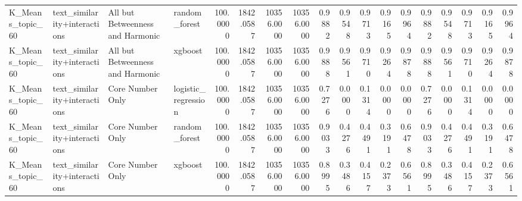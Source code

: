 \begin{tabular}{llllrrrrrrrrrrrrrr}
K_Means_topic_60 & text_similarity+interactions & All but Betweenness and Harmonic & random_forest & 100.0000 & 1842.0587 & 10356.0000 & 10356.0000 & 0.9882 & 0.9548 & 0.9713 & 0.9165 & 0.9964 & 0.9882 & 0.9548 & 0.9713 & 0.9165 & 0.9964 \\
K_Means_topic_60 & text_similarity+interactions & All but Betweenness and Harmonic & xgboost & 100.0000 & 1842.0587 & 10356.0000 & 10356.0000 & 0.9888 & 0.9561 & 0.9710 & 0.9264 & 0.9878 & 0.9888 & 0.9561 & 0.9710 & 0.9264 & 0.9878 \\
K_Means_topic_60 & text_similarity+interactions & Core Number Only & logistic_regression & 100.0000 & 1842.0587 & 10356.0000 & 10356.0000 & 0.7276 & 0.0000 & 0.1314 & 0.0000 & 0.0000 & 0.7276 & 0.0000 & 0.1314 & 0.0000 & 0.0000 \\
K_Means_topic_60 & text_similarity+interactions & Core Number Only & random_forest & 100.0000 & 1842.0587 & 10356.0000 & 10356.0000 & 0.9033 & 0.4276 & 0.4491 & 0.3191 & 0.6478 & 0.9033 & 0.4276 & 0.4491 & 0.3191 & 0.6478 \\
K_Means_topic_60 & text_similarity+interactions & Core Number Only & xgboost & 100.0000 & 1842.0587 & 10356.0000 & 10356.0000 & 0.8995 & 0.3486 & 0.4157 & 0.2373 & 0.6561 & 0.8995 & 0.3486 & 0.4157 & 0.2373 & 0.6561 \\
\bottomrule
\end{tabular}

